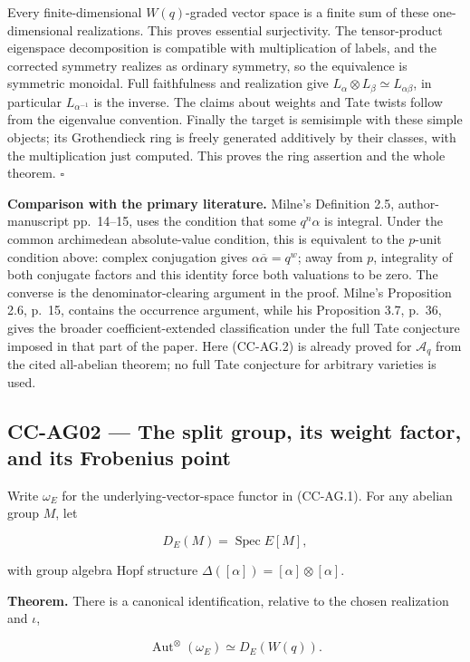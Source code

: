 \documentclass[11pt,a4paper]{article}
\theoremstyle{definition}\newtheorem{definition}[theorem]{Definition}
\theoremstyle{remark}\newtheorem{remark}[theorem]{Remark}
\begin{document}
Every finite-dimensional \(W(q)\)-graded vector space is a finite sum of
these one-dimensional realizations. This proves essential surjectivity.
The tensor-product eigenspace decomposition is compatible with
multiplication of labels, and the corrected symmetry realizes as
ordinary symmetry, so the equivalence is symmetric monoidal. Full
faithfulness and realization give
\(L_\alpha\otimes L_\beta\simeq L_{\alpha\beta}\), in particular
\(L_{\alpha^{-1}}\) is the inverse. The claims about weights and Tate
twists follow from the eigenvalue convention. Finally the target is
semisimple with these simple objects; its Grothendieck ring is freely
generated additively by their classes, with the multiplication just
computed. This proves the ring assertion and the whole theorem.
\(\square\)

\textbf{Comparison with the primary literature.} Milne's Definition 2.5,
author-manuscript pp.~14--15, uses the condition that some \(q^n\alpha\)
is integral. Under the common archimedean absolute-value condition, this
is equivalent to the \(p\)-unit condition above: complex conjugation
gives \(\alpha\overline\alpha=q^w\); away from \(p\), integrality of
both conjugate factors and this identity force both valuations to be
zero. The converse is the denominator-clearing argument in the proof.
Milne's Proposition 2.6, p.~15, contains the occurrence argument, while
his Proposition 3.7, p.~36, gives the broader coefficient-extended
classification under the full Tate conjecture imposed in that part of
the paper. Here (CC-AG.2) is already proved for \(\mathcal A_q\) from
the cited all-abelian theorem; no full Tate conjecture for arbitrary
varieties is used.

\subsection{CC-AG02 --- The split group, its weight factor, and its
Frobenius
point}\label{cc-ag02-the-split-group-its-weight-factor-and-its-frobenius-point}

Write \(\omega_E\) for the underlying-vector-space functor in (CC-AG.1).
For any abelian group \(M\), let

\[
 D_E(M)=\operatorname{Spec}E[M],
\]

with group algebra Hopf structure
\(\Delta([\alpha])=[\alpha]\otimes[\alpha]\).

\textbf{Theorem.} There is a canonical identification, relative to the
chosen realization and \(\iota\),

\[
 \operatorname{Aut}^{\otimes}(\omega_E)
       \simeq D_E(W(q)).                            \tag{CC-AG.3}
\]
\end{document}
